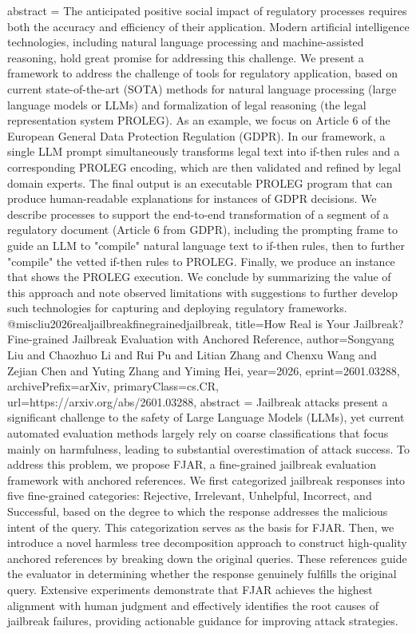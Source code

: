 {      abstract = {The anticipated positive social impact of regulatory processes requires both the accuracy and efficiency of their application. Modern artificial intelligence technologies, including natural language processing and machine-assisted reasoning, hold great promise for addressing this challenge. We present a framework to address the challenge of tools for regulatory application, based on current state-of-the-art (SOTA) methods for natural language processing (large language models or LLMs) and formalization of legal reasoning (the legal representation system PROLEG). As an example, we focus on Article 6 of the European General Data Protection Regulation (GDPR). In our framework, a single LLM prompt simultaneously transforms legal text into if-then rules and a corresponding PROLEG encoding, which are then validated and refined by legal domain experts. The final output is an executable PROLEG program that can produce human-readable explanations for instances of GDPR decisions. We describe processes to support the end-to-end transformation of a segment of a regulatory document (Article 6 from GDPR), including the prompting frame to guide an LLM to "compile" natural language text to if-then rules, then to further "compile" the vetted if-then rules to PROLEG. Finally, we produce an instance that shows the PROLEG execution. We conclude by summarizing the value of this approach and note observed limitations with suggestions to further develop such technologies for capturing and deploying regulatory frameworks.}
}@misc{liu2026realjailbreakfinegrainedjailbreak,
      title={How Real is Your Jailbreak? Fine-grained Jailbreak Evaluation with Anchored Reference}, 
      author={Songyang Liu and Chaozhuo Li and Rui Pu and Litian Zhang and Chenxu Wang and Zejian Chen and Yuting Zhang and Yiming Hei},
      year={2026},
      eprint={2601.03288},
      archivePrefix={arXiv},
      primaryClass={cs.CR},
      url={https://arxiv.org/abs/2601.03288},
      abstract = {Jailbreak attacks present a significant challenge to the safety of Large Language Models (LLMs), yet current automated evaluation methods largely rely on coarse classifications that focus mainly on harmfulness, leading to substantial overestimation of attack success. To address this problem, we propose FJAR, a fine-grained jailbreak evaluation framework with anchored references. We first categorized jailbreak responses into five fine-grained categories: Rejective, Irrelevant, Unhelpful, Incorrect, and Successful, based on the degree to which the response addresses the malicious intent of the query. This categorization serves as the basis for FJAR. Then, we introduce a novel harmless tree decomposition approach to construct high-quality anchored references by breaking down the original queries. These references guide the evaluator in determining whether the response genuinely fulfills the original query. Extensive experiments demonstrate that FJAR achieves the highest alignment with human judgment and effectively identifies the root causes of jailbreak failures, providing actionable guidance for improving attack strategies.}
}
